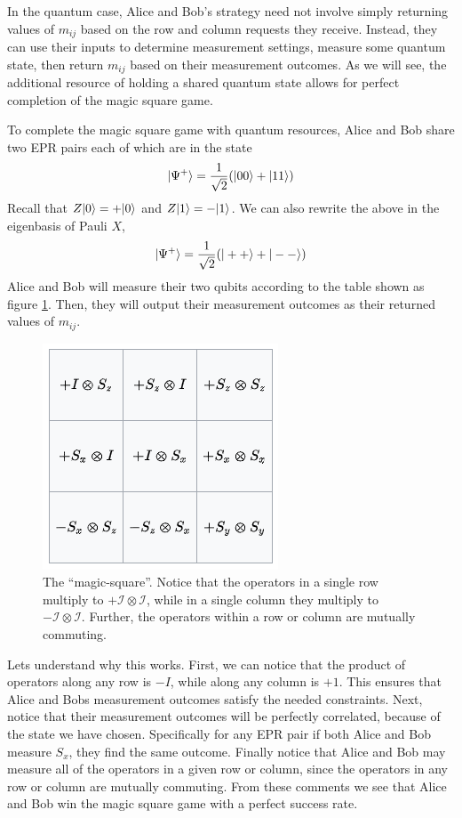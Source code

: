\documentclass[a4paper,11pt]{article}
\begin{document}
In the quantum case, Alice and Bob's strategy need not involve simply returning values of $m_{ij}$ based on the row and column requests they receive. Instead, they can use their inputs to determine measurement settings, measure some quantum state, then return $m_{ij}$ based on their measurement outcomes. As we will see, the additional resource of holding a shared quantum state allows for perfect completion of the magic square game.

To complete the magic square game with quantum resources, Alice and Bob share two EPR pairs each of which are in the state
\begin{align}
    |\Psi^+\rangle=\frac{1}{\sqrt{2}}(|00\rangle+|11\rangle)
\end{align}
Recall that $Z|0\rangle=+|0\rangle$ and $Z|1\rangle=-|1\rangle$. We can also rewrite the above in the eigenbasis of Pauli $X$, 
\begin{align}
    |\Psi^+\rangle=\frac{1}{\sqrt{2}}(|++\rangle+|--\rangle)
\end{align}
Alice and Bob will measure their two qubits according to the table shown as figure \ref{fig:magicsquare}. Then, they will output their measurement outcomes as their returned values of $m_{ij}$. 

\begin{figure}
    \centering
    \includegraphics[scale=0.7]{magic_square.png}
    \caption{The ``magic-square''. Notice that the operators in a single row multiply to $+\mathcal{I}\otimes \mathcal{I}$, while in a single column they multiply to $-\mathcal{I}\otimes \mathcal{I}$. Further, the operators within a row or column are mutually commuting.}
    \label{fig:magicsquare}
\end{figure}

Lets understand why this works. First, we can notice that the product of operators along any row is $-I$, while along any column is $+1$. This ensures that Alice and Bobs measurement outcomes satisfy the needed constraints. Next, notice that their measurement outcomes will be perfectly correlated, because of the state we have chosen. Specifically for any EPR pair if both Alice and Bob measure $S_x$, they find the same outcome. Finally notice that Alice and Bob may measure all of the operators in a given row or column, since the operators in any row or column are mutually commuting. From these comments we see that Alice and Bob win the magic square game with a perfect success rate. 
\end{document}
